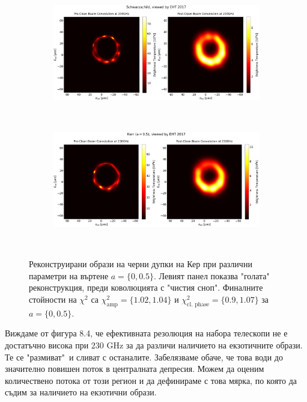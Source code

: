 \begin{figure}[h!]
	\centering
	\begin{subfigure}{12cm}
		\hspace{-1.5cm}
		\includegraphics[scale = 0.23]{Ehtim_plot_2017_no_blur_Sch.png}
	\end{subfigure}\\
	\begin{subfigure}{12cm}
		\hspace{-1.5cm}
		\includegraphics[scale = 0.23]{Ehtim_plot_2017_no_blur_Kerr.png}
	\end{subfigure}\\
	\label{Kerr_EHT_2017}
	\caption[Реконструирани образи на черни дупки на Кер при различни параметри на въртене.]{Реконструирани образи на черни дупки на Кер при различни параметри на въртене $a = \{0, 0.5\}$. Левият панел показва "голата"$\,$ реконструкция, преди коволюцията с "чистия сноп". Финалните стойности на $\chi^2$ са $\chi^2_\text{amp} = \{1.02, 1.04\}$ и $\chi^2_\text{cl. phase} = \{0.9, 1.07\}$ за $a = \{0, 0.5\}$.} 
\end{figure}

\newpage

Виждаме от фигура 8.4, че ефективната резолюция на набора телескопи не е достатъчно висока при $230$ GHz за да различи наличието на екзотичните образи. Те се "размиват"$\,$ и сливат с останалите. Забелязваме обаче, че това води до значително повишен поток в централната депресия. Можем да оценим количествено потока от този регион и да дефинираме с това мярка, по която да съдим за наличието на екзотични образи. 


